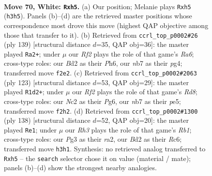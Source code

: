 \documentclass[11pt]{article}
\begin{document}
\clearpage

\begin{figure}[p]\centering
\begin{subfigure}{0.46\textwidth}\centering
\resizebox{\linewidth}{!}{%
\newchessgame
\chessboard[
  setfen={1rr5/pn4k1/1p2p3/4P2p/2P5/K5PR/P1NB1R2/8 w - - 11 70},
  showmover=false,
  pgfstyle=straightmove, color=movearrow, markmove={h3-h5}
]}
\caption{}
\end{subfigure}\hfill
\begin{subfigure}{0.46\textwidth}\centering
\resizebox{\linewidth}{!}{%
\newchessgame
\chessboard[
  setfen={2R5/2R2p1k/5P1p/1r1pp1p1/1P4P1/r6P/3K4/8 b - - 14 70},
  showmover=false,
  pgfstyle=straightmove, color=movearrow, markmove={a3-a2}
]}
\caption{}
\end{subfigure}
\\[4pt]
\begin{subfigure}{0.46\textwidth}\centering
\resizebox{\linewidth}{!}{%
\newchessgame
\chessboard[
  setfen={4k3/R6R/6p1/p3P3/Pp1r4/6Pp/1K5P/3r4 b - - 5 62},
  showmover=false,
  pgfstyle=straightmove, color=movearrow, markmove={d1-d2}
]}
\caption{}
\end{subfigure}\hfill
\begin{subfigure}{0.46\textwidth}\centering
\resizebox{\linewidth}{!}{%
\newchessgame
\chessboard[
  setfen={6k1/8/2R3Np/Pn3p2/7P/5P2/rp1r2PK/1R6 w - - 1 70},
  showmover=false,
  pgfstyle=straightmove, color=movearrow, markmove={b1-e1}
]}
\caption{}
\end{subfigure}
\caption{\textbf{Move 70, White: \texttt{Rxh5}.} (a) Our position; Melanie plays \texttt{Rxh5} (\texttt{h3h5}). Panels (b)--(d) are the retrieved master positions whose correspondence most drove this move (highest QAP objective among those that transfer to it). (b) Retrieved from \texttt{ccrl\_top\_p0002\#26} (ply 139) [structural distance $d$=35, QAP obj=36]: the master played \texttt{Ra2+}; under $\mu$ our \emph{Rf2} plays the role of that game's \emph{Ra6}; cross-type roles: our \emph{B}d2 as their \emph{P}h6, our \emph{n}b7 as their \emph{p}g4; transferred move \texttt{f2e2}. (c) Retrieved from \texttt{ccrl\_top\_p0002\#2063} (ply 123) [structural distance $d$=53, QAP obj=29]: the master played \texttt{R1d2+}; under $\mu$ our \emph{Rf2} plays the role of that game's \emph{Rd8}; cross-type roles: our \emph{N}c2 as their \emph{P}g6, our \emph{n}b7 as their \emph{p}e5; transferred move \texttt{f2h2}. (d) Retrieved from \texttt{ccrl\_top\_p0002\#1300} (ply 138) [structural distance $d$=52, QAP obj=20]: the master played \texttt{Re1}; under $\mu$ our \emph{Rh3} plays the role of that game's \emph{Rb1}; cross-type roles: our \emph{P}g3 as their \emph{r}a2, our \emph{B}d2 as their \emph{R}c6; transferred move \texttt{h3h1}. Synthesis: no retrieved analog transferred to \texttt{Rxh5} -- the \texttt{search} selector chose it on value (material / mate); panels (b)--(d) show the strongest nearby analogies.}
\label{fig:thought-m138}
\end{figure}
\end{document}

